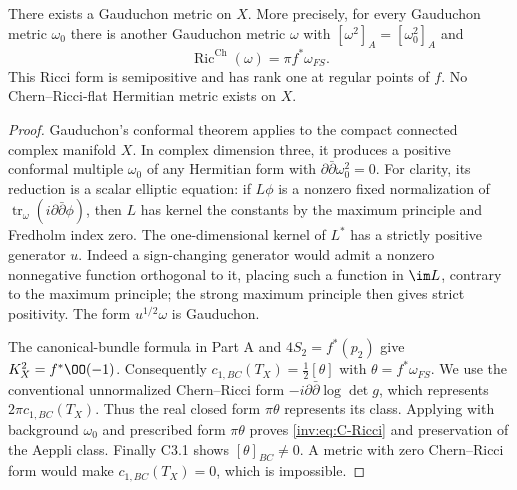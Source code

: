 \begin{proposition}\label{inv:C3.6}
There exists a Gauduchon metric on $X$.  More precisely, for every
Gauduchon metric $\omega_0$ there is another Gauduchon metric
$\omega$ with $[\omega^2]_A=[\omega_0^2]_A$ and
\begin{equation}\label{inv:eq:C-Ricci}
\operatorname{Ric}^{\mathrm{Ch}}(\omega)=\pi f^*\omega_{FS}.
\end{equation}
This Ricci form is semipositive and has rank one at regular points
of $f$.  No Chern--Ricci-flat Hermitian metric exists on $X$.
\end{proposition}
\begin{proof}
Gauduchon's conformal theorem
\citep[Theorem 2, pp. 132--133]{Gauduchon1985} applies to the compact
connected complex manifold $X$.  In complex dimension three, it
produces a positive conformal multiple $\omega_0$ of any Hermitian
form with $\partial\bar\partial\omega_0^2=0$.
For clarity, its reduction is a scalar elliptic equation: if
$L\phi$ is a nonzero fixed normalization of
$\operatorname{tr}_\omega(i\partial\bar\partial\phi)$, then
$L$ has kernel the constants by the maximum principle and Fredholm
index zero.  The one-dimensional kernel of $L^*$ has a strictly
positive generator $u$.  Indeed a sign-changing generator would
admit a nonzero nonnegative function orthogonal to it, placing such
a function in $\im L$, contrary to the maximum principle; the strong
maximum principle then gives strict positivity.  The form
$u^{1/2}\omega$ is Gauduchon.

The canonical-bundle formula in Part A and $4S_2=f^*(p_2)$ give
$K_X^2=f^*\OO(-1)$.  Consequently
$c_{1,BC}(T_X)=\tfrac12[\theta]$ with
$\theta=f^*\omega_{FS}$.  We use the conventional unnormalized
Chern--Ricci form $-i\partial\bar\partial\log\det g$,
which represents $2\pi c_{1,BC}(T_X)$.  Thus the real closed form
$\pi\theta$ represents its class.  Applying
\citet[Theorem 1.3]{STW2017} with background $\omega_0$ and prescribed
form $\pi\theta$ proves \eqref{inv:eq:C-Ricci} and preservation of the
Aeppli class.  Finally C3.1 shows $[\theta]_{BC}\ne0$.  A metric
with zero Chern--Ricci form would make $c_{1,BC}(T_X)=0$, which is
impossible.
\end{proof}

